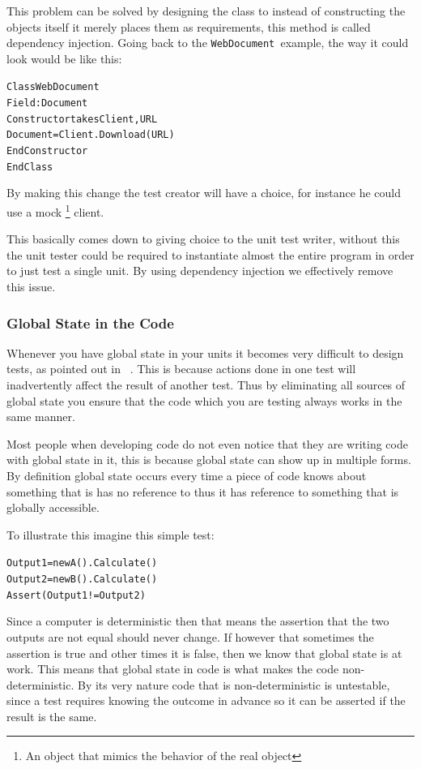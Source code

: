 This problem can be solved by designing the class to instead of constructing
the objects itself it merely places them as requirements, this method
is called dependency injection. Going back to the \texttt{WebDocument
}example, the way it could look would be like this:

\begin{alltt}
Class WebDocument
    Field: Document 
    Constructor takes Client, URL 		
        Document = Client.Download(URL) 	
    EndConstructor 
EndClass
\end{alltt}

By making this change the test creator will have a choice, for instance
he could use a mock%
\footnote{An object that mimics the behavior of the real object%
} client. 

This basically comes down to giving choice to the unit test writer,
without this the unit tester could be required to instantiate almost
the entire program in order to just test a single unit. By using dependency
injection we effectively remove this issue.


\subsubsection*{Global State in the Code}

Whenever you have global state in your units it becomes very difficult
to design tests, as pointed out in ~\cite{LectureSingletons}. This
is because actions done in one test will inadvertently affect the
result of another test. Thus by eliminating all sources of global
state you ensure that the code which you are testing always works
in the same manner.

Most people when developing code do not even notice that they are
writing code with global state in it, this is because global state
can show up in multiple forms. By definition global state occurs every
time a piece of code knows about something that is has no reference
to thus it has reference to something that is globally accessible.

To illustrate this imagine this simple test:

\begin{alltt}
Output1 = new A().Calculate() 
Output2 = new B().Calculate() 
Assert(Output1 != Output2)
\end{alltt}

Since a computer is deterministic then that means the assertion that
the two outputs are not equal should never change. If however that
sometimes the assertion is true and other times it is false, then
we know that global state is at work. This means that global state
in code is what makes the code non-deterministic. By its very nature
code that is non-deterministic is untestable, since a test requires
knowing the outcome in advance so it can be asserted if the result
is the same.


